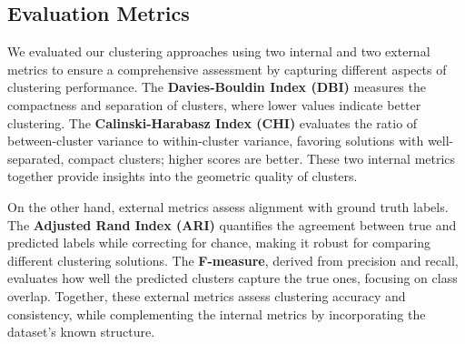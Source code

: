 \subsection{Evaluation Metrics}
\label{subsec:methods-evaluation-metrics}

We evaluated our clustering approaches using two internal and two external metrics to ensure a comprehensive assessment by capturing different aspects of clustering performance. The \textbf{Davies-Bouldin Index (DBI)} measures the compactness and separation of clusters, where lower values indicate better clustering. The \textbf{Calinski-Harabasz Index (CHI)} evaluates the ratio of between-cluster variance to within-cluster variance, favoring solutions with well-separated, compact clusters; higher scores are better. These two internal metrics together provide insights into the geometric quality of clusters.

On the other hand, external metrics assess alignment with ground truth labels. The \textbf{Adjusted Rand Index (ARI)} quantifies the agreement between true and predicted labels while correcting for chance, making it robust for comparing different clustering solutions. The \textbf{F-measure}, derived from precision and recall, evaluates how well the predicted clusters capture the true ones, focusing on class overlap. Together, these external metrics assess clustering accuracy and consistency, while complementing the internal metrics by incorporating the dataset’s known structure.